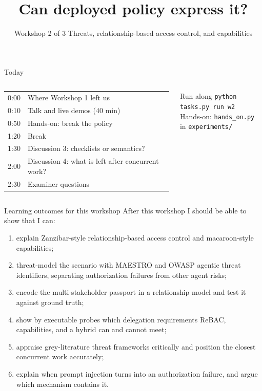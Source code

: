 \documentclass[aspectratio=169, 10pt]{beamer}
\title{Can deployed policy express it?}
\subtitle{Workshop 2 of 3 \textperiodcentered{} Threats, relationship-based access control, and capabilities}
\date{\prep{set the workshop date}}
\begin{document}
\maketitle

\begin{frame}{Today}
  \begin{columns}[T]
    \small
    \begin{tabular}{@{}l l@{}}
      0:00 & Where Workshop 1 left us \\
      0:10 & Talk and live demos (40 min) \\
      0:50 & Hands-on: break the policy \\
      1:20 & Break \\
      1:30 & Discussion 3: checklists or semantics? \\
      2:00 & Discussion 4: what is left after concurrent work? \\
      2:30 & Examiner questions \\
    \end{tabular}
    \begin{block}{Run along}
      \footnotesize\texttt{python tasks.py run w2}\\[2pt]
      Hands-on: \texttt{hands\_on.py} in \texttt{experiments/}
    \end{block}
  \end{columns}
\end{frame}

\begin{frame}{Learning outcomes for this workshop}
  \small After this workshop I should be able to show that I can:
  \begin{enumerate}
    \item[K2.1] explain Zanzibar-style relationship-based access control and macaroon-style capabilities;
    \item[S2.2] threat-model the scenario with MAESTRO and OWASP agentic threat identifiers, separating authorization failures from other agent risks;
    \item[S2.3] encode the multi-stakeholder passport in a relationship model and test it against ground truth;
    \item[S2.4] show by executable probes which delegation requirements ReBAC, capabilities, and a hybrid can and cannot meet;
    \item[J2.5] appraise grey-literature threat frameworks critically and position the closest concurrent work accurately;
    \item[J2.6] explain when prompt injection turns into an authorization failure, and argue which mechanism contains it.
  \end{enumerate}
\end{frame}
\end{document}
